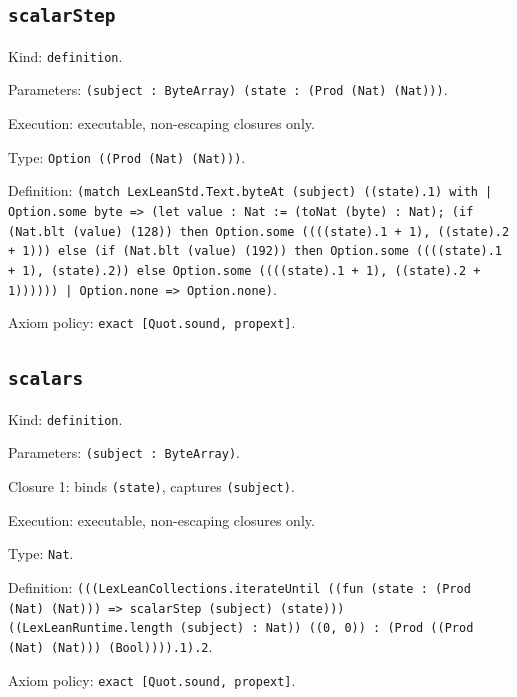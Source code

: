 \documentclass[11pt]{article}
\begin{document}
\subsection*{\texttt{scalarStep}}
\noindent Kind: \texttt{definition}.\par
\noindent Parameters: \texttt{(subject : ByteArray) (state : (Prod (Nat) (Nat)))}.\par
\noindent Execution: executable, non-escaping closures only.\par
\noindent Type: \texttt{Option ((Prod (Nat) (Nat)))}.\par
\noindent Definition: \texttt{(match LexLeanStd.Text.byteAt (subject) ((state).1) with | Option.some byte => (let value : Nat := (toNat (byte) : Nat); (if (Nat.blt (value) (128)) then Option.some ((((state).1 + 1), ((state).2 + 1))) else (if (Nat.blt (value) (192)) then Option.some ((((state).1 + 1), (state).2)) else Option.some ((((state).1 + 1), ((state).2 + 1)))))) | Option.none => Option.none)}.\par
\noindent Axiom policy: \texttt{exact [Quot.sound, propext]}.\par
\subsection*{\texttt{scalars}}
\noindent Kind: \texttt{definition}.\par
\noindent Parameters: \texttt{(subject : ByteArray)}.\par
\noindent Closure 1: binds \texttt{(state)}, captures \texttt{(subject)}.\par
\noindent Execution: executable, non-escaping closures only.\par
\noindent Type: \texttt{Nat}.\par
\noindent Definition: \texttt{(((LexLeanCollections.iterateUntil ((fun (state : (Prod (Nat) (Nat))) => scalarStep (subject) (state))) ((LexLeanRuntime.length (subject) : Nat)) ((0, 0)) : (Prod ((Prod (Nat) (Nat))) (Bool)))).1).2}.\par
\noindent Axiom policy: \texttt{exact [Quot.sound, propext]}.\par
\end{document}
